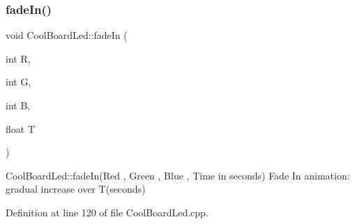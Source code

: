 \subsubsection{\texorpdfstring{fade\+In()}{fadeIn()}}
{\footnotesize\ttfamily void Cool\+Board\+Led\+::fade\+In (\begin{DoxyParamCaption}\item[{int}]{R,  }\item[{int}]{G,  }\item[{int}]{B,  }\item[{float}]{T }\end{DoxyParamCaption})}

Cool\+Board\+Led\+::fade\+In(\+Red , Green , Blue , Time in seconds) Fade In animation\+: gradual increase over T(seconds) 

Definition at line 120 of file Cool\+Board\+Led.\+cpp.


